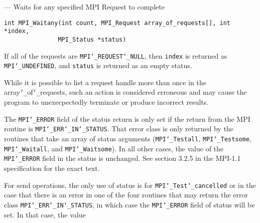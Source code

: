\startmanpage
{}
--- Waits for any specified MPI Request to complete 
\startvb\begin{verbatim}
int MPI_Waitany(int count, MPI_Request array_of_requests[], int *index, 
               MPI_Status *status)

\end{verbatim}
\endvb

\par
{}
\par
{}
If all of the requests are {\tt MPI{\tt \char`\_}REQUEST{\tt \char`\_}NULL}, then {\tt index} is returned as
{\tt MPI{\tt \char`\_}UNDEFINED}, and {\tt status} is returned as an empty status.
\par
While it is possible to list a request handle more than once in the
array{\tt \char`\_}of{\tt \char`\_}requests, such an action is considered erroneous and may cause the
program to unexecpectedly terminate or produce incorrect results.
\par
{}
\par
The {\tt MPI{\tt \char`\_}ERROR} field of the status return is only set if
the return from the MPI routine is {\tt MPI{\tt \char`\_}ERR{\tt \char`\_}IN{\tt \char`\_}STATUS}.  That error class
is only returned by the routines that take an array of status arguments
({\tt MPI{\tt \char`\_}Testall}, {\tt MPI{\tt \char`\_}Testsome}, {\tt MPI{\tt \char`\_}Waitall}, and {\tt MPI{\tt \char`\_}Waitsome}).  In
all other cases, the value of the {\tt MPI{\tt \char`\_}ERROR} field in the status is
unchanged.  See section 3.2.5 in the MPI-1.1 specification for the
exact text.
\par
For send operations, the only use of status is for {\tt MPI{\tt \char`\_}Test{\tt \char`\_}cancelled} or
in the case that there is an error in one of the four routines that
may return the error class {\tt MPI{\tt \char`\_}ERR{\tt \char`\_}IN{\tt \char`\_}STATUS}, in which case the
{\tt MPI{\tt \char`\_}ERROR} field of status will be set.  In that case, the value
